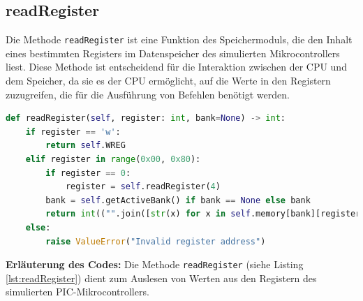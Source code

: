 
\subsection{readRegister}

Die Methode \texttt{readRegister} ist eine Funktion des Speichermoduls, die den Inhalt eines bestimmten Registers im Datenspeicher des simulierten Mikrocontrollers liest. Diese Methode ist entscheidend für die Interaktion zwischen der CPU und dem Speicher, da sie es der CPU ermöglicht, auf die Werte in den Registern zuzugreifen, die für die Ausführung von Befehlen benötigt werden.

\begin{lstlisting}[language=Python, caption={Ausschnitt der readRegister-Methode im Speichermodul}, label={lst:readRegister}]
def readRegister(self, register: int, bank=None) -> int:
    if register == 'w':
        return self.WREG
    elif register in range(0x00, 0x80):
        if register == 0:
            register = self.readRegister(4)
        bank = self.getActiveBank() if bank == None else bank
        return int(("".join([str(x) for x in self.memory[bank][register]])),2)
    else:
        raise ValueError("Invalid register address")
\end{lstlisting}
\textbf{Erläuterung des Codes:}
Die Methode \texttt{readRegister} (siehe Listing \ref{lst:readRegister}) dient zum Auslesen von Werten aus den Registern des simulierten PIC-Mikrocontrollers.
